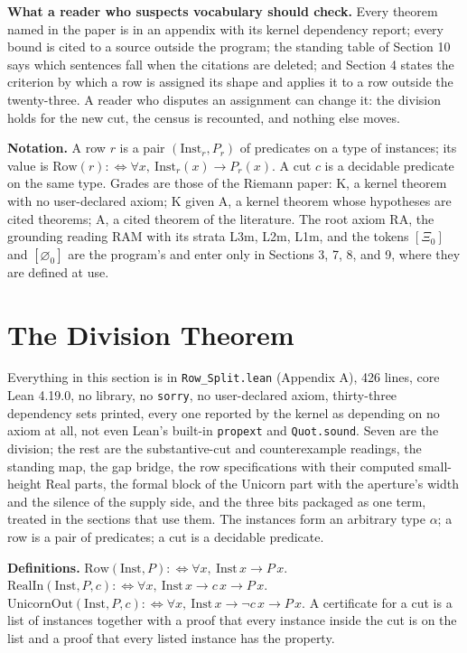 \documentclass[10pt,twocolumn]{article}
\begin{document}
\textbf{What a reader who suspects vocabulary should check.} Every
theorem named in the paper is in an appendix with its kernel dependency
report; every bound is cited to a source outside the program; the
standing table of Section 10 says which sentences fall when the
citations are deleted; and Section 4 states the criterion by which a row
is assigned its shape and applies it to a row outside the twenty-three.
A reader who disputes an assignment can change it: the division holds
for the new cut, the census is recounted, and nothing else moves.

\textbf{Notation.} A row \(r\) is a pair \((\mathrm{Inst}_r, P_r)\) of
predicates on a type of instances; its value is
\(\mathrm{Row}(r) :\Leftrightarrow \forall x,\ \mathrm{Inst}_r(x) \to P_r(x)\).
A cut \(c\) is a decidable predicate on the same type. Grades are those
of the Riemann paper: K, a kernel theorem with no user-declared axiom; K
given A, a kernel theorem whose hypotheses are cited theorems; A, a
cited theorem of the literature. The root axiom \(\mathrm{RA}\), the
grounding reading RAM with its strata L3m, L2m, L1m, and the tokens
\([\Xi_0]\) and \([\varnothing_0]\) are the program's and enter only in
Sections 3, 7, 8, and 9, where they are defined at use.

\hypertarget{the-division-theorem}{%
\section{The Division Theorem}\label{the-division-theorem}}

Everything in this section is in \texttt{Row\_Split.lean} (Appendix A),
426 lines, core Lean 4.19.0, no library, no \texttt{sorry}, no
user-declared axiom, thirty-three dependency sets printed, every one
reported by the kernel as depending on no axiom at all, not even Lean's
built-in \texttt{propext} and \texttt{Quot.sound}. Seven are the
division; the rest are the substantive-cut and counterexample readings,
the standing map, the gap bridge, the row specifications with their
computed small-height Real parts, the formal block of the Unicorn part
with the aperture's width and the silence of the supply side, and the
three bits packaged as one term, treated in the sections that use them.
The instances form an arbitrary type \(\alpha\); a row is a pair of
predicates; a cut is a decidable predicate.

\textbf{Definitions.}
\(\mathrm{Row}(\mathrm{Inst}, P) :\Leftrightarrow \forall x,\ \mathrm{Inst}\,x \to P\,x\).
\(\mathrm{RealIn}(\mathrm{Inst}, P, c) :\Leftrightarrow \forall x,\ \mathrm{Inst}\,x \to c\,x \to P\,x\).
\(\mathrm{UnicornOut}(\mathrm{Inst}, P, c) :\Leftrightarrow \forall x,\ \mathrm{Inst}\,x \to \neg c\,x \to P\,x\).
A certificate for a cut is a list of instances together with a proof
that every instance inside the cut is on the list and a proof that every
listed instance has the property.
\end{document}
